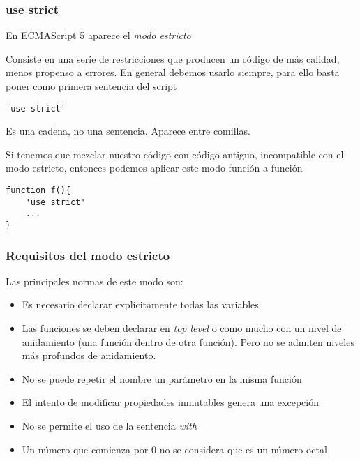 \documentclass[ucs]{beamer}
\begin{document}
\begin{frame}[fragile]
\frametitle{use strict}

En ECMAScript 5 aparece el 
\emph{modo estricto} 

Consiste en una serie de restricciones que producen un código
de más calidad, menos propenso a errores. En general debemos usarlo siempre, 
para ello basta poner como primera sentencia del script 

  \begin{scriptsize}
  \begin{verbatim}
'use strict'
  \end{verbatim}
  \end{scriptsize}

Es una cadena, no una sentencia. Aparece entre comillas.


Si tenemos que mezclar nuestro código con código antiguo, incompatible
con el modo estricto, entonces podemos aplicar este
modo función a función

  \begin{scriptsize}
  \begin{verbatim}
function f(){
    'use strict'
    ...
}
  \end{verbatim}
  \end{scriptsize}

\end{frame}

\begin{frame}[fragile]
\frametitle{Requisitos del modo estricto}

Las principales normas de este modo son:
    \begin{itemize}
    \item
Es necesario declarar explícitamente todas las variables
    \item
Las funciones se deben declarar en
\emph{top level} o como mucho con un nivel de anidamiento
(una función dentro de otra función). Pero no se admiten
niveles más profundos de anidamiento.
    \item
No se puede repetir el nombre un parámetro en la misma función
    \item
El intento de modificar propiedades inmutables genera una excepción
    \item
No se permite el uso de la sentencia \emph{with}
    \item
Un número que comienza por 0 no se considera que es un número octal
    \end{itemize}


\end{frame}
\end{document}
